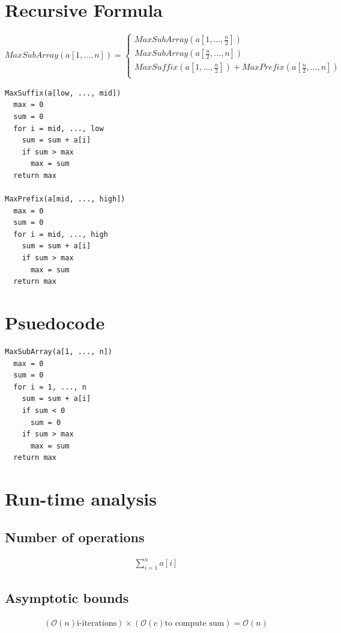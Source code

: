 \documentclass{article}
\begin{document}
\section*{Recursive Formula}

\[
  MaxSubArray(a[1, \ldots, n]) =
  \begin{cases}
      MaxSubArray\left(a[1, \ldots, \frac{n}{2}]\right)\\
      MaxSubArray\left(a[\frac{n}{2}, \ldots, n]\right)\\
      MaxSuffix\left(a[1, \ldots, \frac{n}{2}]\right) +
      MaxPrefix\left(a[\frac{n}{2}, \ldots, n]\right)\\
  \end{cases}
\]

\begin{verbatim}
MaxSuffix(a[low, ..., mid])
  max = 0
  sum = 0
  for i = mid, ..., low
    sum = sum + a[i]
    if sum > max
      max = sum
  return max

MaxPrefix(a[mid, ..., high])
  max = 0
  sum = 0
  for i = mid, ..., high
    sum = sum + a[i]
    if sum > max
      max = sum
  return max
\end{verbatim}

\section*{Psuedocode}

\begin{verbatim}
MaxSubArray(a[1, ..., n])
  max = 0
  sum = 0
  for i = 1, ..., n
    sum = sum + a[i]
    if sum < 0
      sum = 0
    if sum > max
      max = sum
  return max
\end{verbatim}

\section*{Run-time analysis}

\subsection*{Number of operations}
\begin{eqnarray*}
  \sum_{i=1}^{n}a[i]
\end{eqnarray*}

\subsection*{Asymptotic bounds}
\begin{eqnarray*}
    (\mathcal{O}(n) \text{i-iterations}) \times
    (\mathcal{O}(c) \text{to compute sum}) = \mathcal{O}(n)
\end{eqnarray*}
\end{document}
